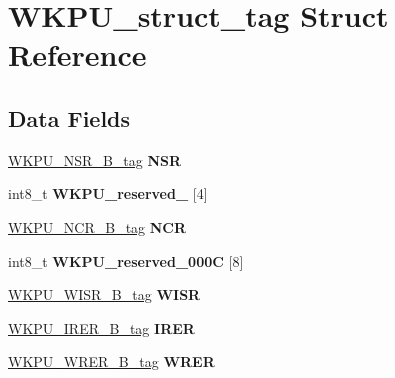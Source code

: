 \hypertarget{structWKPU__struct__tag}{}\section{W\+K\+P\+U\+\_\+struct\+\_\+tag Struct Reference}
\label{structWKPU__struct__tag}
\subsection*{Data Fields}
\begin{DoxyCompactItemize}
\item 
\mbox{\label{structWKPU__struct__tag_ab093a8994fdbb21c46041429415afac4}} 
\mbox{\hyperlink{unionWKPU__NSR__32B__tag}{W\+K\+P\+U\+\_\+\+N\+S\+R\+\_\+B\+\_\+tag}} {\bfseries N\+SR}
\item 
\mbox{\label{structWKPU__struct__tag_a8bbcc8edac633b4060143712a8c56d0d}} 
int8\+\_\+t {\bfseries W\+K\+P\+U\+\_\+reserved\+\_} \mbox{[}4\mbox{]}
\item 
\mbox{\label{structWKPU__struct__tag_a769a96e2cf2b45c5645f17e2cfcfaefe}} 
\mbox{\hyperlink{unionWKPU__NCR__32B__tag}{W\+K\+P\+U\+\_\+\+N\+C\+R\+\_\+B\+\_\+tag}} {\bfseries N\+CR}
\item 
\mbox{\label{structWKPU__struct__tag_a06ca9eb9729e2bbccd97517e567e44cb}} 
int8\+\_\+t {\bfseries W\+K\+P\+U\+\_\+reserved\+\_\+000C} \mbox{[}8\mbox{]}
\item 
\mbox{\label{structWKPU__struct__tag_a5b757c913f8f3b8c0ee367d0c97770a2}} 
\mbox{\hyperlink{unionWKPU__WISR__32B__tag}{W\+K\+P\+U\+\_\+\+W\+I\+S\+R\+\_\+B\+\_\+tag}} {\bfseries W\+I\+SR}
\item 
\mbox{\label{structWKPU__struct__tag_a18085f66a060e9210b410b0977fd9706}} 
\mbox{\hyperlink{unionWKPU__IRER__32B__tag}{W\+K\+P\+U\+\_\+\+I\+R\+E\+R\+\_\+B\+\_\+tag}} {\bfseries I\+R\+ER}
\item 
\mbox{\label{structWKPU__struct__tag_aa95781c90d483034ece2af861077eb59}} 
\mbox{\hyperlink{unionWKPU__WRER__32B__tag}{W\+K\+P\+U\+\_\+\+W\+R\+E\+R\+\_\+B\+\_\+tag}} {\bfseries W\+R\+ER}

\end{DoxyCompactItemize}
